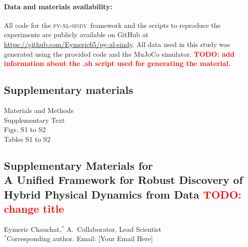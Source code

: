 \documentclass[12pt]{article}
\newcommand{\frameworkname}{\textsc{py-xl-sindy}}
\newcommand{\TODO}[1]{\textbf{\textcolor{red}{\Large TODO: \normalsize #1}}}
\def\scititle{
	A Unified Framework for Robust Discovery of Hybrid Physical Dynamics from Data \TODO{change title}
}
\begin{document}
\paragraph*{Data and materials availability:}
All code for the \frameworkname\ framework and the scripts to reproduce the experiments are publicly available on GitHub at \url{https://github.com/Eymeric65/py-xl-sindy}. All data used in this study was generated using the provided code and the MuJoCo simulator. \TODO{ add information about the .sh script used for generating the material.}



\subsection*{Supplementary materials}
Materials and Methods\\
Supplementary Text\\
Figs. S1 to S2\\
Tables S1 to S2\\


\newpage


\renewcommand{\thefigure}{S\arabic{figure}}
\renewcommand{\thetable}{S\arabic{table}}
\renewcommand{\theequation}{S\arabic{equation}}
\renewcommand{\thepage}{S\arabic{page}}
\setcounter{figure}{0}
\setcounter{table}{0}
\setcounter{equation}{0}
\setcounter{page}{1} %



\begin{center}
\section*{Supplementary Materials for\\ \scititle}

Eymeric Chauchat,$^{\ast}$ A.~Collaborator, Lead Scientist\\
\small$^\ast$Corresponding author. Email: [Your Email Here]
\end{center}
\end{document}
